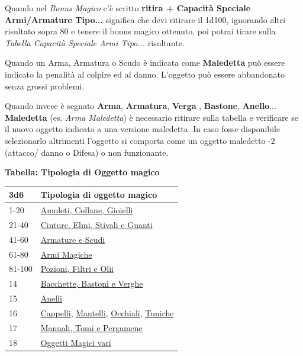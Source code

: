 \begin{multicols}{2}
{Quando nel \emph{Bonus Magico} c'è scritto \textbf{ritira + Capacità Speciale Armi/Armature Tipo...} significa che devi ritirare il 1d100, ignorando altri risultato sopra 80 e tenere il bonus magico ottenuto, poi potrai tirare sulla \emph{Tabella Capacità Speciale Armi Tipo...} risultante.

Quando un Arma, Armatura o Scudo è indicata come \textbf{Maledetta} può essere indicato la penalità al colpire ed al danno. L'oggetto può essere abbandonato senza grossi problemi.

Quando invece è segnato \textbf{Arma}, \textbf{Armatura}, \textbf{Verga} , \textbf{Bastone}, \textbf{Anello}... \textbf{Maledetta} (es. \emph{Arma Maledetta}) è necessario ritirare sulla tabella e verificare se il nuovo oggetto indicato a una versione maledetta. In caso fosse disponibile selezionarlo altrimenti l'oggetto si comporta come un oggetto maledetto -2 (attacco/ danno o Difesa) o non funzionante.\hypertarget{Arma Maledetta}{}\hypertarget{Maledetta}{}\hypertarget{Armatura Maledetta}{}

\medskip

\textbf{Tabella: Tipologia di Oggetto magico}\label{tipologiaoggettomagico}\hypertarget{tipologiaoggettomagico}{}

{\small \begin{tabular}{ll}
		\toprule
\textbf{3d6}& \textbf{Tipologia di oggetto magico}\\
\toprule
1-20 &\hyperlink{amuleticollanegioielli}{Amuleti, Collane, Gioielli}\\
21-40 &\hyperlink{cintureelmi}{Cinture, Elmi, Stivali e Guanti}\\
41-60 &\hyperlink{armatureescudi}{Armature e Scudi}\\
61-80 &\hyperlink{armimagiche}{Armi Magiche}\\
81-100 &\hyperlink{pozionifiltri}{Pozioni, Filtri e Olii}\\
14&\hyperlink{bastonibacchette}{Bacchette, Bastoni e Verghe}\\
15&\hyperlink{anellimagici}{Anelli}\\
16&\hyperlink{Cappelli}{Cappelli}, \hyperlink{Mantelli}{Mantelli}, \hyperlink{OcchialidaNotte}{Occhiali}, \hyperlink{Tuniche}{Tuniche}\\
17&\hyperlink{manualitomi}{Manuali, Tomi e Pergamene}\\
18&\hyperlink{oggettimagicivari}{Oggetti Magici vari}
\end{tabular}}

}
\end{multicols}
